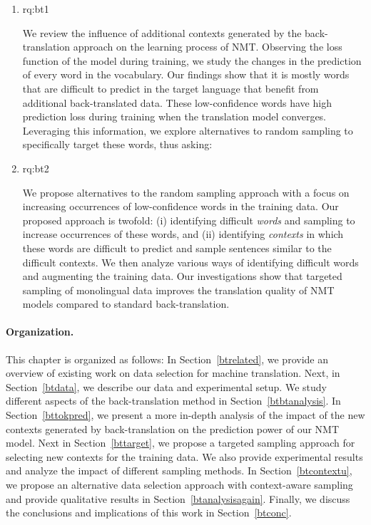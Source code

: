 \begin{enumerate}[label=\textbf{RQ2.\arabic* },wide = 0pt, leftmargin=2em]
\setlength\itemsep{1em}
 \setcounter{enumi}{2}
\item \acl{rq:bt1}

\medskip

\noindent We review the influence of additional contexts generated by the back-translation approach on the learning process of NMT. 
Observing the loss function of the model during training, we study the changes in the prediction of every word in the vocabulary. 
Our findings show that it is mostly words that are difficult to predict in the target language that benefit from additional back-translated data. 
These low-confidence words have high prediction loss during training when the translation model converges.
Leveraging this information, we explore alternatives to random sampling to specifically target these words, thus asking:

\item \acl{rq:bt2}

\medskip

\noindent We propose alternatives to the random sampling approach with a focus on increasing occurrences of low-confidence words in the training data.
Our proposed approach is twofold: (i) identifying difficult \textit{words} and sampling to increase occurrences of these words, and (ii) identifying \textit{contexts} in which these words are difficult to predict and sample sentences similar to the difficult contexts.
We then analyze various ways of identifying difficult words and augmenting the training data.  
Our investigations show that targeted sampling of monolingual data improves the translation quality of NMT models compared to standard back-translation. 

\end{enumerate}
 
\paragraph{Organization.} This chapter is organized as follows: In Section~\ref{btrelated}, we provide an overview of existing work on data selection for machine translation. 
Next, in Section~\ref{btdata}, we describe our data and experimental setup.
We study different aspects of the back-translation method in Section~\ref{btbtanalysis}.
In Section~\ref{bttokpred}, we present a more in-depth analysis of the impact of the new contexts generated by back-translation on the prediction power of our NMT model. 
Next in Section~\ref{bttarget}, we propose a targeted sampling approach for selecting new contexts for the training data. 
We also provide experimental results and analyze the impact of different sampling methods. 
In Section~\ref{btcontextu}, we propose an alternative data selection approach with context-aware sampling and provide qualitative results in Section~\ref{btanalysisagain}. 
Finally, we discuss the conclusions and implications of this work in Section~\ref{btconc}. 


